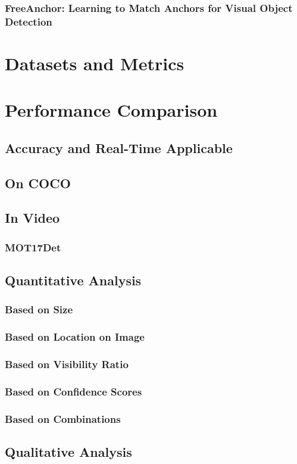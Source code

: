 \documentclass[12pt, letterpaper, twoside]{article}
\begin{document}
\subsubsection{FreeAnchor: Learning to Match Anchors for Visual Object Detection}

\section{Datasets and Metrics}
\section{Performance Comparison}
\subsection{Accuracy and Real-Time Applicable}
\subsection{On COCO}

\subsection{In Video}
\subsubsection{MOT17Det}

\subsection{Quantitative Analysis}
\subsubsection{Based on Size}
\subsubsection{Based on Location on Image}
\subsubsection{Based on Visibility Ratio}
\subsubsection{Based on Confidence Scores}
\subsubsection{Based on Combinations}

\subsection{Qualitative Analysis}
\end{document}
